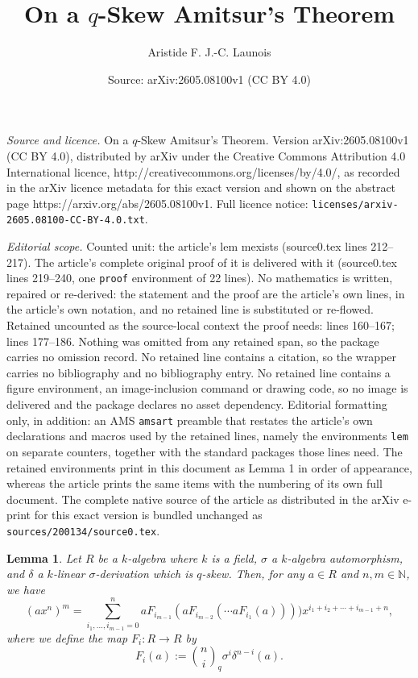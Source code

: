 \documentclass[10pt,a4paper]{amsart}
\title{On a $q$-Skew Amitsur's Theorem}
\author{Aristide F. J.-C. Launois}
\date{Source: arXiv:2605.08100v1 (CC BY 4.0)}
\newtheorem{lem}{Lemma}
\begin{document}
\maketitle

\noindent\emph{Source and licence.} On a $q$-Skew Amitsur's Theorem. Version arXiv:2605.08100v1 (CC BY 4.0), distributed by arXiv under the Creative Commons Attribution 4.0 International licence, http://creativecommons.org/licenses/by/4.0/, as recorded in the arXiv licence metadata for this exact version and shown on the abstract page https://arxiv.org/abs/2605.08100v1. Full licence notice: \texttt{licenses/arxiv-2605.08100-CC-BY-4.0.txt}.\par\smallskip

\noindent\textit{Editorial scope.} Counted unit: the article's lem mexists (source0.tex lines 212--217). The article's complete original proof of it is delivered with it (source0.tex lines 219--240, one \texttt{proof} environment of 22 lines). No mathematics is written, repaired or re-derived: the statement and the proof are the article's own lines, in the article's own notation, and no retained line is substituted or re-flowed.  Retained uncounted as the source-local context the proof needs: lines 160--167; lines 177--186.  Nothing was omitted from any retained span, so the package carries no omission record.  No retained line contains a citation, so the wrapper carries no bibliography and no bibliography entry.  No retained line contains a figure environment, an image-inclusion command or drawing code, so no image is delivered and the package declares no asset dependency.  Editorial formatting only, in addition: an AMS \texttt{amsart} preamble that restates the article's own declarations and macros used by the retained lines, namely the environments \texttt{lem} on separate counters, together with the standard packages those lines need.  The retained environments print in this document as Lemma 1 in order of appearance, whereas the article prints the same items with the numbering of its own full document.  The complete native source of the article as distributed in the arXiv e-print for this exact version is bundled unchanged as \texttt{sources/200134/source0.tex}.
\begin{lem}
    \label{iteratedgoodearlformula}Let $R$ be a $k$-algebra where $k$ is a field, $\sigma$ a $k$-algebra automorphism, and $\delta$ a $k$-linear
    $\sigma$-derivation which is $q$-skew. Then, for any $a \in R$ and $n,m \in \mathbb{N}$, we have\[
    (ax^n)^m = \sum_{i_1,\dots,i_{m-1} = 0}^n aF_{i_{m-1}}(aF_{i_{m-2}}(\cdots aF_{i_1}(a))))x^{i_1+i_2+\cdots+i_{m-1}+n},
    \] where we define the map $F_i:R \to R$ by \[
        F_i(a):= \binom{n}{i}_q\sigma^i\delta^{n-i}(a).
    \]
\end{lem}
\end{document}
